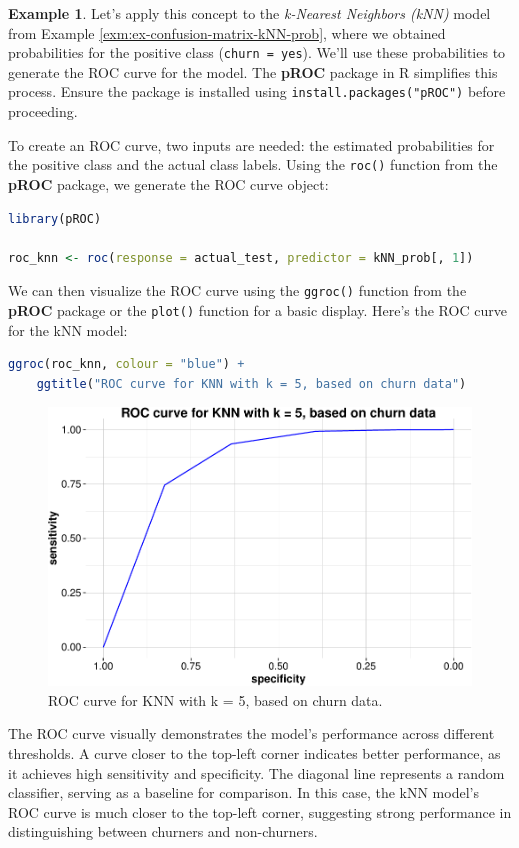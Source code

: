 \documentclass[
]{book}
\newcommand{\passthrough}[1]{#1}
\theoremstyle{definition}
\theoremstyle{definition}
\newtheorem{example}{Example}[chapter]
\theoremstyle{definition}
\theoremstyle{definition}
\theoremstyle{remark}
\begin{document}
\begin{example}
\protect\hypertarget{exm:ex-roc-curve-kNN}{}\label{exm:ex-roc-curve-kNN}Let's apply this concept to the \emph{k-Nearest Neighbors (kNN)} model from Example \ref{exm:ex-confusion-matrix-kNN-prob}, where we obtained probabilities for the positive class (\passthrough{\lstinline!churn = yes!}). We'll use these probabilities to generate the ROC curve for the model. The \textbf{pROC} package in R simplifies this process. Ensure the package is installed using \passthrough{\lstinline!install.packages("pROC")!} before proceeding.

To create an ROC curve, two inputs are needed: the estimated probabilities for the positive class and the actual class labels. Using the \passthrough{\lstinline!roc()!} function from the \textbf{pROC} package, we generate the ROC curve object:

\begin{lstlisting}[language=R]
library(pROC)

roc_knn <- roc(response = actual_test, predictor = kNN_prob[, 1])
\end{lstlisting}

We can then visualize the ROC curve using the \passthrough{\lstinline!ggroc()!} function from the \textbf{pROC} package or the \passthrough{\lstinline!plot()!} function for a basic display. Here's the ROC curve for the kNN model:

\begin{lstlisting}[language=R]
ggroc(roc_knn, colour = "blue") +
    ggtitle("ROC curve for KNN with k = 5, based on churn data")
\end{lstlisting}

\begin{figure}

{\centering \includegraphics[width=0.65\linewidth]{evaluation_files/figure-latex/roc-knn-churn-1} 

}

\caption{ROC curve for KNN with k = 5, based on churn data.}\label{fig:roc-knn-churn}
\end{figure}

The ROC curve visually demonstrates the model's performance across different thresholds. A curve closer to the top-left corner indicates better performance, as it achieves high sensitivity and specificity. The diagonal line represents a random classifier, serving as a baseline for comparison. In this case, the kNN model's ROC curve is much closer to the top-left corner, suggesting strong performance in distinguishing between churners and non-churners.
\end{example}
\end{document}
